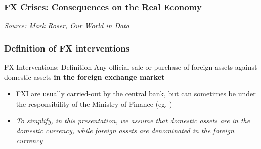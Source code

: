 \documentclass{beamer}
\begin{document}
\begin{frame}
\frametitle{FX Crises: Consequences on the Real Economy}
\medskip
\emph{Source: Mark Roser, Our World in Data}
\end{frame}




\begin{frame}
  \frametitle{Definition of FX interventions}

  \begin{alertblock}{FX Interventions: Definition}
    Any official sale or purchase of foreign assets against domestic assets \textbf{in the foreign exchange market}    
  \end{alertblock}

  \begin{itemize}
  \item FXI are usually carried-out by the central bank, but can sometimes be under the responsibility of the Ministry of Finance (eg. \href{https://www.mof.go.jp/english/policy/international_policy/reference/feio/index.html}{})
  \item \emph{To simplify, in this presentation, we assume that domestic assets are in the domestic currency, while foreign assets are denominated in the foreign currency}
  \end{itemize}  
\end{frame}
\end{document}
